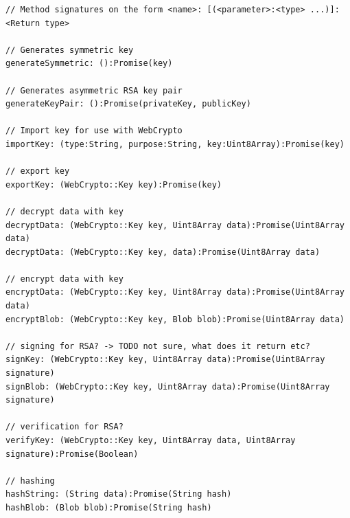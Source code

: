 \begin{Code}
\begin{lstlisting}[caption={Public methods of \texttt{RymdCrypto}}, label={lst:cryptointerface}]
// Method signatures on the form <name>: [(<parameter>:<type> ...)]:<Return type>

// Generates symmetric key 
generateSymmetric: ():Promise(key)

// Generates asymmetric RSA key pair 
generateKeyPair: ():Promise(privateKey, publicKey)

// Import key for use with WebCrypto 
importKey: (type:String, purpose:String, key:Uint8Array):Promise(key)

// export key
exportKey: (WebCrypto::Key key):Promise(key)

// decrypt data with key
decryptData: (WebCrypto::Key key, Uint8Array data):Promise(Uint8Array data)
decryptData: (WebCrypto::Key key, data):Promise(Uint8Array data)

// encrypt data with key
encryptData: (WebCrypto::Key key, Uint8Array data):Promise(Uint8Array data) 
encryptBlob: (WebCrypto::Key key, Blob blob):Promise(Uint8Array data) 

// signing for RSA? -> TODO not sure, what does it return etc?
signKey: (WebCrypto::Key key, Uint8Array data):Promise(Uint8Array signature)
signBlob: (WebCrypto::Key key, Uint8Array data):Promise(Uint8Array signature)

// verification for RSA?
verifyKey: (WebCrypto::Key key, Uint8Array data, Uint8Array signature):Promise(Boolean)

// hashing
hashString: (String data):Promise(String hash)
hashBlob: (Blob blob):Promise(String hash)

\end{lstlisting}
\end{Code}


